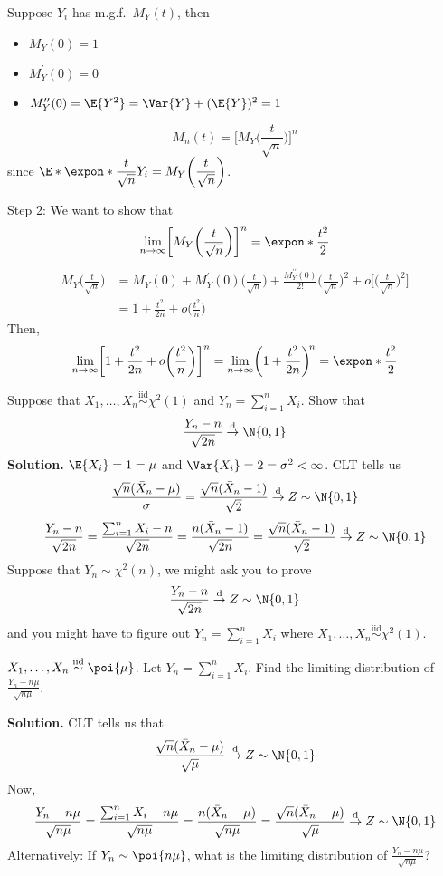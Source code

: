 Suppose $ Y_i $ has m.g.f.\ $ M_Y(t) $, then
\begin{itemize}
    \item $ M_Y(0)=1 $
    \item $ M_Y^\prime(0)=0 $
    \item $ M_Y^{\prime\prime}(0)=\E{Y^2}=\Var{Y}+(\E{Y})^2=1 $
\end{itemize}
\[ M_n(t)=\biggl[M_Y\biggl( \frac{t}{\sqrt{n}} \biggr)\biggr]^n \]
since $
    \displaystyle \E*{\expon*{\frac{t}{\sqrt{n}}Y_i}}=M_Y\biggl(\frac{t}{\sqrt{n}}\biggr) $.

Step 2: We want to show that
\[ \lim\limits_{{n} \to {\infty}}
    \biggl[M_Y\biggl(\frac{t}{\sqrt{n}} \biggr)\biggr]^n=\expon*{\frac{t^2}{2}} \]
\begin{align*}
    M_Y\biggl(\frac{t}{\sqrt{n}} \biggr)
     & =M_Y(0)+M_Y^\prime(0)\biggl(\frac{t}{\sqrt{n}} \biggr)+
    \frac{M_Y^{\prime\prime}(0)}{2!}\biggl(\frac{t}{\sqrt{n}} \biggr)^{\!2}
    +o\biggl[\biggl(\frac{t}{\sqrt{n}} \biggr)^{\!2}\biggr]    \\
     & =1+\frac{t^2}{2n} +o\biggl(\frac{t^2}{n}\biggr)
\end{align*}
Then,
\[ \lim\limits_{{n} \to {\infty}}
    \biggl[1+\frac{t^2}{2n} +o\biggl(\frac{t^2}{n}\biggr)\biggr]^n=
    \lim\limits_{{n} \to {\infty}} \biggl(1+\frac{t^2}{2n}\biggr)^{\!n}=\expon*{\frac{t^2}{2}}  \]
\begin{Example}{}{}
    Suppose that $ X_1,\ldots,X_n \stackrel{\text{iid}}{\sim} \chi^2(1) $
    and $ Y_n=\sum_{i=1}^{n} X_i $. Show that
    \[ \frac{Y_n-n}{\sqrt{2n}} \stackrel{\text{d}}{\to}\N{0,1} \]
    \textbf{Solution.} $ \E{X_i}=1=\mu $ and $ \Var{X_i}=2=\sigma^2<\infty $.
    CLT tells us
    \[ \frac{\sqrt{n}(\bar{X}_n-\mu)}{\sigma}=
        \frac{\sqrt{n}(\bar{X}_n-1)}{\sqrt{2}}\stackrel{\text{d}}{\to}Z\sim \N{0,1} \]
    \[ \frac{Y_n-n}{\sqrt{2n}}=
        \frac{\sum_{i=1}^{n} X_i-n}{\sqrt{2n}}=\frac{n(\bar{X}_n-1)}{\sqrt{2n}}
        =\frac{\sqrt{n}(\bar{X}_n-1)}{\sqrt{2}}\stackrel{\text{d}}{\to}Z\sim\N{0,1}  \]
    Suppose that $ Y_n \sim \chi^2(n) $, we might ask you to prove
    \[ \frac{Y_n-n}{\sqrt{2n}} \stackrel{\text{d}}{\to}Z\sim \N{0,1} \]
    and you might have to figure out $ Y_n=\sum_{i=1}^{n} X_i $
    where $ X_1,\ldots,X_n\stackrel{\text{iid}}{\sim}\chi^2(1) $.
\end{Example}
\begin{Example}{}{}
    $ X_1,\ldots,X_n\stackrel{\text{iid}}{\sim}\poi{\mu} $.
    Let $ Y_n=\sum_{i=1}^{n} X_i $. Find the limiting
    distribution of $ \displaystyle \frac{Y_n-n\mu}{\sqrt{n\mu}} $.

    \textbf{Solution.} CLT tells us that
    \[ \frac{\sqrt{n}(\bar{X}_n-\mu)}{\sqrt{\mu}}\stackrel{\text{d}}{\to}Z\sim \N{0,1} \]
    Now,
    \[ \frac{Y_n-n\mu}{\sqrt{n\mu}}=
        \frac{\sum_{i=1}^{n} X_i-n\mu}{\sqrt{n\mu}}=
        \frac{n(\bar{X}_n-\mu)}{\sqrt{n\mu}}=
        \frac{\sqrt{n}(\bar{X}_n-\mu)}{\sqrt{\mu}}\stackrel{\text{d}}{\to}Z\sim \N{0,1}  \]
    Alternatively: If $ Y_n \sim \poi{n\mu} $, what is the limiting
    distribution of  $ \displaystyle \frac{Y_n-n\mu}{\sqrt{n\mu}} $?
\end{Example}
